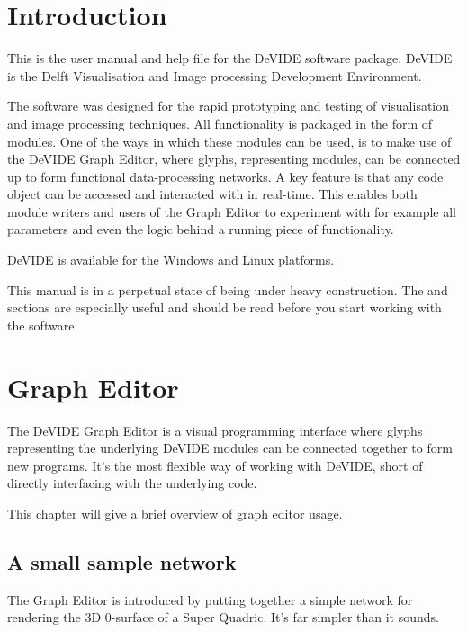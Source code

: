 \chapter{Introduction}%
%
%
\setfooter{\thepage}{}{}{}{}{\thepage}%
This is the user manual and help file for the DeVIDE software package.
DeVIDE is the Delft Visualisation and Image processing Development
Environment.

The software was designed for the rapid prototyping and testing of
visualisation and image processing techniques.  All functionality is
packaged in the form of modules.  One of the ways in which these
modules can be used, is to make use of the DeVIDE Graph Editor, where
glyphs, representing modules, can be connected up to form functional
data-processing networks.  A key feature is that any code object can
be accessed and interacted with in real-time.  This enables both
module writers and users of the Graph Editor to experiment with for
example all parameters and even the logic behind a running piece of
functionality.

DeVIDE is available for the Windows and Linux platforms.  

This manual is in a perpetual state of being under heavy construction.
The  and  sections are especially useful and
should be read before you start working with the software.

\chapter{Graph Editor}\label{sec_graph_editor}
%
%
\setfooter{\thepage}{}{}{}{}{\thepage}%

The DeVIDE Graph Editor is a visual programming interface where glyphs
representing the underlying DeVIDE modules can be connected together
to form new programs.  It's the most flexible way of working with
DeVIDE, short of directly interfacing with the underlying code.

This chapter will give a brief overview of graph editor usage.

\section{A small sample network}
The Graph Editor is introduced by putting together a simple network for
rendering the 3D 0-surface of a Super Quadric.  It's far simpler than
it sounds.

